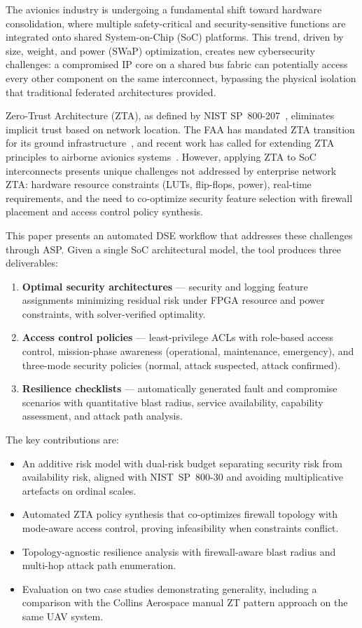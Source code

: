 \documentclass[conference]{IEEEtran}
\begin{document}
The avionics industry is undergoing a fundamental shift toward hardware
consolidation, where multiple safety-critical and security-sensitive
functions are integrated onto shared System-on-Chip (SoC) platforms.
This trend, driven by size, weight, and power (SWaP) optimization, creates
new cybersecurity challenges: a compromised IP core on a shared bus fabric
can potentially access every other component on the same interconnect,
bypassing the physical isolation that traditional federated architectures
provided.

Zero-Trust Architecture (ZTA), as defined by NIST SP~800-207~\cite{nist_zta},
eliminates implicit trust based on network location. The FAA has mandated
ZTA transition for its ground infrastructure~\cite{faa_zt}, and recent work
has called for extending ZTA principles to airborne avionics
systems~\cite{ztas_dasc}. However, applying ZTA to SoC interconnects presents
unique challenges not addressed by enterprise network ZTA: hardware resource
constraints (LUTs, flip-flops, power), real-time requirements, and
the need to co-optimize security feature selection with firewall placement
and access control policy synthesis.

This paper presents an automated DSE workflow that addresses these challenges
through ASP. Given a single SoC architectural model, the tool produces
three deliverables:

\begin{enumerate}
\item \textbf{Optimal security architectures} --- security and logging
  feature assignments minimizing residual risk under FPGA resource and
  power constraints, with solver-verified optimality.
\item \textbf{Access control policies} --- least-privilege ACLs with
  role-based access control, mission-phase awareness (operational,
  maintenance, emergency), and three-mode security policies
  (normal, attack suspected, attack confirmed).
\item \textbf{Resilience checklists} --- automatically generated fault and
  compromise scenarios with quantitative blast radius, service availability,
  capability assessment, and attack path analysis.
\end{enumerate}

The key contributions are:
\begin{itemize}
\item An additive risk model with dual-risk budget separating security risk
  from availability risk, aligned with NIST~SP~800-30 and avoiding
  multiplicative artefacts on ordinal scales.
\item Automated ZTA policy synthesis that co-optimizes firewall topology
  with mode-aware access control, proving infeasibility when constraints
  conflict.
\item Topology-agnostic resilience analysis with firewall-aware blast radius
  and multi-hop attack path enumeration.
\item Evaluation on two case studies demonstrating generality, including a
  comparison with the Collins Aerospace manual ZT pattern approach on
  the same UAV system.
\end{itemize}
\end{document}
